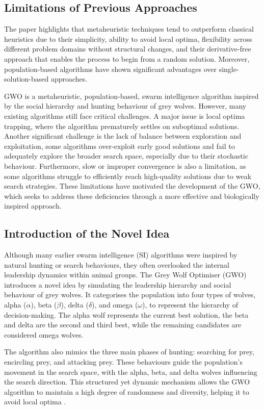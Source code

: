 \documentclass[a4paper, 12pt]{extarticle}
\begin{document}
\subsection{Limitations of Previous Approaches}
The paper \cite{mirjalili2014grey} highlights that metaheuristic techniques tend to outperform classical heuristics due to their simplicity, ability to avoid local optima, flexibility across different problem domains without structural changes, and their derivative-free approach that enables the process to begin from a random solution. Moreover, population-based algorithms have shown significant advantages over single-solution-based approaches.

GWO is a metaheuristic, population-based, swarm intelligence algorithm inspired by the social hierarchy and hunting behaviour of grey wolves. However, many existing algorithms still face critical challenges. A major issue is local optima trapping, where the algorithm prematurely settles on suboptimal solutions. Another significant challenge is the lack of balance between exploration and exploitation, some algorithms over-exploit early good solutions and fail to adequately explore the broader search space, especially due to their stochastic behaviour. Furthermore, slow or improper convergence is also a limitation, as some algorithms struggle to efficiently reach high-quality solutions due to weak search strategies. These limitations have motivated the development of the GWO, which seeks to address these deficiencies through a more effective and biologically inspired approach. 

\subsection{Introduction of the Novel Idea}
Although many earlier swarm intelligence (SI) algorithms were inspired by natural hunting or search behaviours, they often overlooked the internal leadership dynamics within animal groups. The Grey Wolf Optimiser (GWO) introduces a novel idea by simulating the leadership hierarchy and social behaviour of grey wolves. It categorises the population into four types of wolves, alpha ($\alpha$), beta ($\beta$), delta ($\delta$), and omega ($\omega$), to represent the hierarchy of decision-making. The alpha wolf represents the current best solution, the beta and delta are the second and third best, while the remaining candidates are considered omega wolves.

The algorithm also mimics the three main phases of hunting: searching for prey, encircling prey, and attacking prey. These behaviours guide the population’s movement in the search space, with the alpha, beta, and delta wolves influencing the search direction. This structured yet dynamic mechanism allows the GWO algorithm to maintain a high degree of randomness and diversity, helping it to avoid local optima \cite{kandasamy2020literature}.
\end{document}

